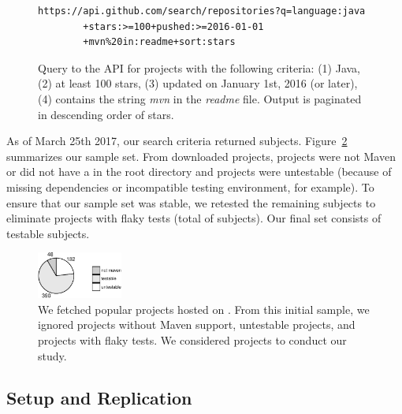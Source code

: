 \vspace{1ex}
\begin{figure}[h!]
\centering
\scriptsize
{}
\begin{lstlisting}
https://api.github.com/search/repositories?q=language:java
        +stars:>=100+pushed:>=2016-01-01
        +mvn%20in:readme+sort:stars
\end{lstlisting}
    \caption{\label{fig:subject-query} Query to the \github{} API for
    projects with the following criteria: (1) Java, (2) at least 100
    stars, (3) updated on January 1st, 2016 (or later), (4) contains
    the string \emph{mvn} in the \emph{readme} file. Output is
    paginated in descending order of stars.}
\end{figure}

As of March 25th 2017, our search criteria returned \SubjectsGithub{}
subjects. Figure~\ref{fig:subjects} summarizes our sample set. From
\SubjectsGithub{} downloaded projects, \SubjectsGithubNotMaven{}
projects were not Maven or did not have a \pomf{} in the root
directory and \SubjectsGithubNotTestable{} projects were untestable
(because of missing dependencies or incompatible testing environment,
for example). To ensure that our sample set was stable, we retested
the remaining subjects to eliminate projects with flaky tests (total of
\SubjectsGithubFlaky{} subjects). Our final set consists of
\numSubjs{} testable subjects.

\begin{figure}[ht]
    \centering
    \includegraphics[width=0.25\textwidth]{plots/subjs.pdf}
    \caption{\label{fig:subjects}We fetched \SubjectsGithub{} popular
    projects hosted on \github{}. From this initial sample, we ignored
    \SubjectsGithubNotMaven{} projects without Maven support,
    \SubjectsGithubNotTestable{} untestable projects, and
    \SubjectsGithubFlaky{} projects with flaky tests. We considered
    \numSubjs{} projects to conduct our study.}
\end{figure}

\subsection{Setup and Replication}
\label{sec:setup}

